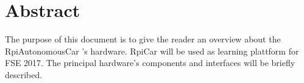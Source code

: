 \documentclass[
12pt, %
a4paper, %
oneside, %
headinclude,footinclude, %
BCOR5mm, %
]{scrartcl}
\title{\normalfont\spacedallcaps{RPi based autonomous Car}} %
\author{\spacedlowsmallcaps{Fullstack Embedded (2017)}}
\date{} %
\begin{document}

\renewcommand{\sectionmark}[1]{\markright{\spacedlowsmallcaps{#1}}} %
\lehead{\mbox{\llap{\small\thepage\kern1em\color{halfgray} \vline}\color{halfgray}\hspace{0.5em}\rightmark\hfil}} %

\pagestyle{scrheadings} %


\maketitle %

\setcounter{tocdepth}{2} %

\tableofcontents %

\listoffigures %

\listoftables %


\section*{Abstract} %
The purpose of this document is to give the reader an overview about the RpiAutonomousCar 's hardware. RpiCar will be used as learning plattform for FSE 2017. The principal hardware's components and interfaces will be briefly described.
\end{document}
